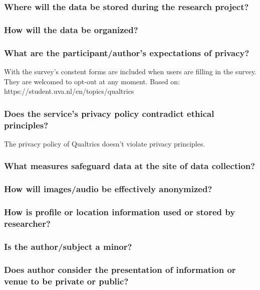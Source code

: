 \documentclass[a4paper]{article}
\begin{document}
\subsubsection{Where will the data be stored during the research project?}

\subsubsection{How will the data be organized?}

\subsubsection{What are the participant/author’s expectations of privacy?}

With the survey's constent forms are included when users are filling in the survey. They are welcomed to opt-out at any moment. Based on: https://student.uva.nl/en/topics/qualtrics

\subsubsection{Does the service’s privacy policy contradict ethical principles?}

The privacy policy of Qualtrics doesn't violate privacy principles.

\subsubsection{What measures safeguard data at the site of data collection?}

\subsubsection{How will images/audio be effectively anonymized?}

\subsubsection{How is profile or location information used or stored by researcher?}

\subsubsection{Is the author/subject a minor?}

\subsubsection{ Does author consider the presentation of information or venue to be private or public?}
\end{document}
